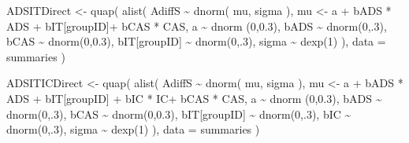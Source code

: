 \documentclass[
  10pt,
  dvipsnames,enabledeprecatedfontcommands]{scrartcl}
\newenvironment{Shaded}{\begin{snugshade}}{\end{snugshade}}
\newcommand{\AttributeTok}[1]{\textcolor[rgb]{0.77,0.63,0.00}{#1}}
\newcommand{\DecValTok}[1]{\textcolor[rgb]{0.00,0.00,0.81}{#1}}
\newcommand{\FloatTok}[1]{\textcolor[rgb]{0.00,0.00,0.81}{#1}}
\newcommand{\FunctionTok}[1]{\textcolor[rgb]{0.00,0.00,0.00}{#1}}
\newcommand{\NormalTok}[1]{#1}
\newcommand{\OtherTok}[1]{\textcolor[rgb]{0.56,0.35,0.01}{#1}}
\newcommand{\SpecialCharTok}[1]{\textcolor[rgb]{0.00,0.00,0.00}{#1}}
\begin{document}
\begin{Shaded}
\begin{Highlighting}[]
\NormalTok{ADSITDirect }\OtherTok{\textless{}{-}} \FunctionTok{quap}\NormalTok{(}
  \FunctionTok{alist}\NormalTok{(}
\NormalTok{    AdiffS }\SpecialCharTok{\textasciitilde{}} \FunctionTok{dnorm}\NormalTok{( mu, sigma ),}
\NormalTok{    mu }\OtherTok{\textless{}{-}}\NormalTok{ a }\SpecialCharTok{+}\NormalTok{ bADS }\SpecialCharTok{*}\NormalTok{ ADS }\SpecialCharTok{+}\NormalTok{  bIT[groupID]}\SpecialCharTok{+}\NormalTok{ bCAS }\SpecialCharTok{*}\NormalTok{ CAS,}
\NormalTok{    a }\SpecialCharTok{\textasciitilde{}} \FunctionTok{dnorm}\NormalTok{ (}\DecValTok{0}\NormalTok{,}\FloatTok{0.3}\NormalTok{),}
\NormalTok{    bADS }\SpecialCharTok{\textasciitilde{}} \FunctionTok{dnorm}\NormalTok{(}\DecValTok{0}\NormalTok{,.}\DecValTok{3}\NormalTok{),}
\NormalTok{    bCAS }\SpecialCharTok{\textasciitilde{}} \FunctionTok{dnorm}\NormalTok{(}\DecValTok{0}\NormalTok{,}\FloatTok{0.3}\NormalTok{),}
\NormalTok{    bIT[groupID] }\SpecialCharTok{\textasciitilde{}} \FunctionTok{dnorm}\NormalTok{(}\DecValTok{0}\NormalTok{,.}\DecValTok{3}\NormalTok{),}
\NormalTok{    sigma  }\SpecialCharTok{\textasciitilde{}} \FunctionTok{dexp}\NormalTok{(}\DecValTok{1}\NormalTok{)}
\NormalTok{  ), }
  \AttributeTok{data =}\NormalTok{ summaries}
\NormalTok{)}


\NormalTok{ADSITICDirect }\OtherTok{\textless{}{-}} \FunctionTok{quap}\NormalTok{(}
  \FunctionTok{alist}\NormalTok{(}
\NormalTok{    AdiffS }\SpecialCharTok{\textasciitilde{}} \FunctionTok{dnorm}\NormalTok{( mu, sigma ),}
\NormalTok{    mu }\OtherTok{\textless{}{-}}\NormalTok{ a }\SpecialCharTok{+}\NormalTok{ bADS }\SpecialCharTok{*}\NormalTok{ ADS }\SpecialCharTok{+}\NormalTok{  bIT[groupID] }\SpecialCharTok{+}\NormalTok{ bIC }\SpecialCharTok{*}\NormalTok{ IC}\SpecialCharTok{+}\NormalTok{ bCAS }\SpecialCharTok{*}\NormalTok{ CAS,}
\NormalTok{    a }\SpecialCharTok{\textasciitilde{}} \FunctionTok{dnorm}\NormalTok{ (}\DecValTok{0}\NormalTok{,}\FloatTok{0.3}\NormalTok{),}
\NormalTok{    bADS }\SpecialCharTok{\textasciitilde{}} \FunctionTok{dnorm}\NormalTok{(}\DecValTok{0}\NormalTok{,.}\DecValTok{3}\NormalTok{),}
\NormalTok{    bCAS }\SpecialCharTok{\textasciitilde{}} \FunctionTok{dnorm}\NormalTok{(}\DecValTok{0}\NormalTok{,}\FloatTok{0.3}\NormalTok{),}
\NormalTok{    bIT[groupID] }\SpecialCharTok{\textasciitilde{}} \FunctionTok{dnorm}\NormalTok{(}\DecValTok{0}\NormalTok{,.}\DecValTok{3}\NormalTok{),}
\NormalTok{    bIC }\SpecialCharTok{\textasciitilde{}} \FunctionTok{dnorm}\NormalTok{(}\DecValTok{0}\NormalTok{,.}\DecValTok{3}\NormalTok{),}
\NormalTok{    sigma  }\SpecialCharTok{\textasciitilde{}} \FunctionTok{dexp}\NormalTok{(}\DecValTok{1}\NormalTok{)}
\NormalTok{  ), }
  \AttributeTok{data =}\NormalTok{ summaries}
\NormalTok{)}



\end{Highlighting}
\end{Shaded}
\end{document}
